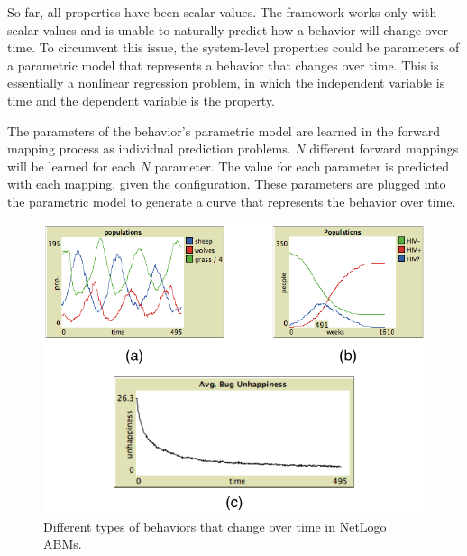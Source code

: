 So far, all properties have been scalar values.
The framework works only with scalar values and is unable to naturally predict how a behavior will change over time.
To circumvent this issue, the system-level properties could be parameters of a parametric model that represents a behavior that changes over time.
This is essentially a nonlinear regression problem, in which the independent variable is time and the dependent variable is the property.

The parameters of the behavior's parametric model are learned in the forward mapping process as individual prediction problems.
$N$ different forward mappings will be learned for each $N$ parameter.
The value for each parameter is predicted with each mapping, given the configuration.
These parameters are plugged into the parametric model to generate a curve that represents the behavior over time.

\begin{figure}[ht]
\centering
\includegraphics{images/overtime_compare.pdf}
\caption{Different types of behaviors that change over time in NetLogo ABMs. }
\label{fig:overtime_compare}
\end{figure}



